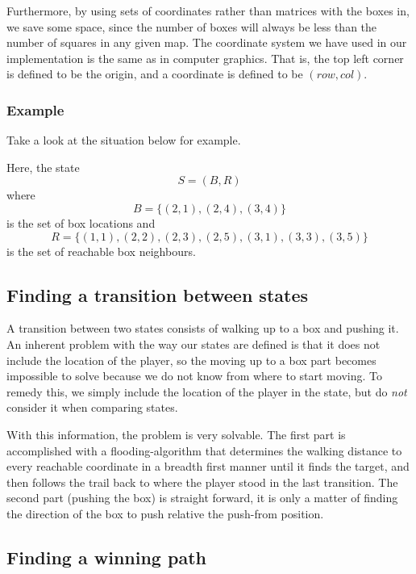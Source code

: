 \documentclass[a4paper,11pt]{article}
\begin{document}
Furthermore, by using sets of coordinates rather than matrices with the boxes in,
we save some space, since the number of boxes will always be less than the number of squares in any
given map.
The coordinate system we have used in our implementation is the same as in computer graphics.
That is, the top left corner is defined to be the origin, and a coordinate is defined to be
$(row, col)$.

\subsubsection{Example}
Take a look at the situation below for example.


Here, the state
$$
S = (B, R)
$$
where $$B = \{(2, 1), (2, 4), (3, 4)\}$$
is the set of box locations and
$$R =\{(1,1), (2,2), (2,3), (2,5), (3,1), (3,3), (3,5)\}$$
is the set of reachable box neighbours.

\subsection{Finding a transition between states}

A transition between two states consists of walking up to a box and pushing it.
An inherent problem with the way our states are defined is that it does not include the location
of the player, so the moving up to a box part becomes impossible to solve because
we do not know from where to start moving.
To remedy this, we simply include the location of the player in the state,
but do \emph{not} consider it when comparing states.

With this information, the problem is very solvable.
The first part is accomplished with a flooding-algorithm that
determines the walking distance to every reachable coordinate in a breadth
first manner until it finds the target, and then follows the trail back to
where the player stood in the last transition.
The second part (pushing the box) is straight forward, it is only a matter 
of finding the direction of the box to push relative the push-from position.

\subsection{Finding a winning path}
\end{document}
